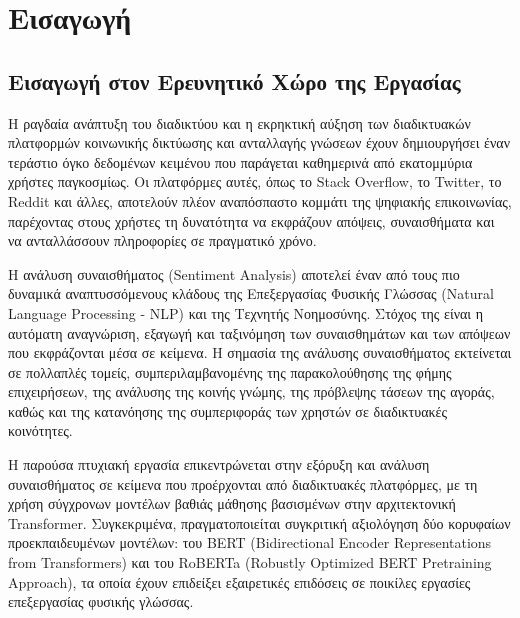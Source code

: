 \documentclass[a4paper,11pt,oneside,openany]{ioniothesis}
\begin{document}
\tableofcontents

\newpage

\section{Εισαγωγή}
\label{sec:Εισαγωγή}

\subsection{Εισαγωγή στον Ερευνητικό Χώρο της Εργασίας}
\label{sec:Εισαγωγή στον Ερευνητικό Χώρο της Εργασίας}

Η ραγδαία ανάπτυξη του διαδικτύου και η εκρηκτική αύξηση των διαδικτυακών πλατφορμών κοινωνικής δικτύωσης και ανταλλαγής γνώσεων έχουν δημιουργήσει έναν τεράστιο όγκο δεδομένων κειμένου που παράγεται καθημερινά από εκατομμύρια χρήστες παγκοσμίως. Οι πλατφόρμες αυτές, όπως το Stack Overflow, το Twitter, το Reddit και άλλες, αποτελούν πλέον αναπόσπαστο κομμάτι της ψηφιακής επικοινωνίας, παρέχοντας στους χρήστες τη δυνατότητα να εκφράζουν απόψεις, συναισθήματα και να ανταλλάσσουν πληροφορίες σε πραγματικό χρόνο.

Η ανάλυση συναισθήματος (Sentiment Analysis) αποτελεί έναν από τους πιο δυναμικά αναπτυσσόμενους κλάδους της Επεξεργασίας Φυσικής Γλώσσας (Natural Language Processing - NLP) και της Τεχνητής Νοημοσύνης. Στόχος της είναι η αυτόματη αναγνώριση, εξαγωγή και ταξινόμηση των συναισθημάτων και των απόψεων που εκφράζονται μέσα σε κείμενα. Η σημασία της ανάλυσης συναισθήματος εκτείνεται σε πολλαπλές τομείς, συμπεριλαμβανομένης της παρακολούθησης της φήμης επιχειρήσεων, της ανάλυσης της κοινής γνώμης, της πρόβλεψης τάσεων της αγοράς, καθώς και της κατανόησης της συμπεριφοράς των χρηστών σε διαδικτυακές κοινότητες.

Η παρούσα πτυχιακή εργασία επικεντρώνεται στην εξόρυξη και ανάλυση συναισθήματος σε κείμενα που προέρχονται από διαδικτυακές πλατφόρμες, με τη χρήση σύγχρονων μοντέλων βαθιάς μάθησης βασισμένων στην αρχιτεκτονική Transformer. Συγκεκριμένα, πραγματοποιείται συγκριτική αξιολόγηση δύο κορυφαίων προεκπαιδευμένων μοντέλων: του BERT (Bidirectional Encoder Representations from Transformers) και του RoBERTa (Robustly Optimized BERT Pretraining Approach), τα οποία έχουν επιδείξει εξαιρετικές επιδόσεις σε ποικίλες εργασίες επεξεργασίας φυσικής γλώσσας.
\end{document}
